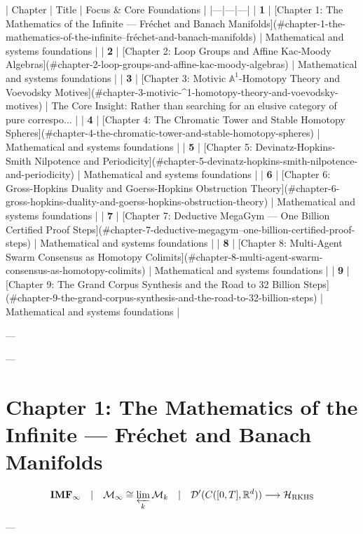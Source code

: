 \documentclass[11pt,twoside,openright]{amsbook}
\begin{document}
| Chapter | Title | Focus & Core Foundations |
|---|---|---|
| \textbf{1} | [Chapter 1: The Mathematics of the Infinite — Fréchet and Banach Manifolds](#chapter-1-the-mathematics-of-the-infinite--fréchet-and-banach-manifolds) | Mathematical and systems foundations |
| \textbf{2} | [Chapter 2: Loop Groups and Affine Kac-Moody Algebras](#chapter-2-loop-groups-and-affine-kac-moody-algebras) | Mathematical and systems foundations |
| \textbf{3} | [Chapter 3: Motivic $\mathbb{A}^1$-Homotopy Theory and Voevodsky Motives](#chapter-3-motivic-^1-homotopy-theory-and-voevodsky-motives) | The Core Insight:\textit{} Rather than searching for an elusive category of pure correspo... |
| \textbf{4} | [Chapter 4: The Chromatic Tower and Stable Homotopy Spheres](#chapter-4-the-chromatic-tower-and-stable-homotopy-spheres) | Mathematical and systems foundations |
| \textbf{5} | [Chapter 5: Devinatz-Hopkins-Smith Nilpotence and Periodicity](#chapter-5-devinatz-hopkins-smith-nilpotence-and-periodicity) | Mathematical and systems foundations |
| \textbf{6} | [Chapter 6: Gross-Hopkins Duality and Goerss-Hopkins Obstruction Theory](#chapter-6-gross-hopkins-duality-and-goerss-hopkins-obstruction-theory) | Mathematical and systems foundations |
| \textbf{7} | [Chapter 7: Deductive MegaGym — One Billion Certified Proof Steps](#chapter-7-deductive-megagym--one-billion-certified-proof-steps) | Mathematical and systems foundations |
| \textbf{8} | [Chapter 8: Multi-Agent Swarm Consensus as Homotopy Colimits](#chapter-8-multi-agent-swarm-consensus-as-homotopy-colimits) | Mathematical and systems foundations |
| \textbf{9} | [Chapter 9: The Grand Corpus Synthesis and the Road to 32 Billion Steps](#chapter-9-the-grand-corpus-synthesis-and-the-road-to-32-billion-steps) | Mathematical and systems foundations |

---



---

\chapter{Chapter 1: The Mathematics of the Infinite — Fréchet and Banach Manifolds}

$$\mathbf{IMF}_{\infty} \quad \vert \quad \mathcal{M}_{\infty} \cong \varprojlim_{k} \mathcal{M}_k \quad \vert \quad \mathcal{D}'(C([0, T], \mathbb{R}^d)) \longrightarrow \mathcal{H}_{\mathrm{RKHS}}$$

---
\end{document}
